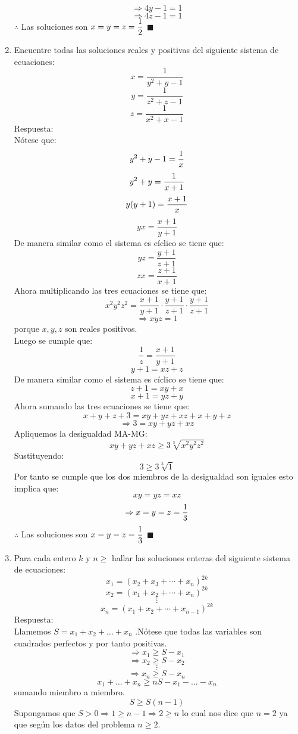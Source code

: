 \documentclass{book}
\begin{document}
\begin{enumerate}
          $$\Rightarrow 4y-1=1$$
          $$\Rightarrow 4z-1=1$$
          $\therefore$ Las soluciones son $\displaystyle{x=y=z={1\over 2}}$ $\blacksquare$\\
    \item Encuentre todas las soluciones reales y positivas del siguiente sistema de ecuaciones:
          $$x=\frac{1}{y^2+y-1}$$
          $$y=\frac{1}{z^2+z-1}$$
          $$z=\frac{1}{x^2+x-1}$$
          Respuesta:\\
          Nótese que:
          $$y^2+y-1={1\over x}$$
          $$y^2+y={1\over x+1}$$
          $$y(y+1)={x+1\over x}$$
          $$yx=\frac{x+1}{y+1}$$
          De manera similar como el sistema es cíclico se tiene que:
          $$yz=\frac{y+1}{z+1}$$
          $$zx=\frac{z+1}{x+1}$$
          Ahora multiplicando las tres ecuaciones se tiene que:
          $$x^2 y^2 z^2=\frac{x+1}{y+1}\cdot\frac{y+1}{z+1}\cdot\frac{y+1}{z+1}$$
          $$\Rightarrow xyz=1$$
          porque $x,y,z$ son reales positivos.\\
          Luego se cumple que:
          $$\frac{1}{z}=\frac{x+1}{y+1}$$
          $$y+1=xz+z$$
          De manera similar como el sistema es cíclico se tiene que:
          $$z+1=xy+x$$
          $$x+1=yz+y$$
          Ahora sumando las tres ecuaciones se tiene que:
          $$x+y+z+3=xy+yz+xz+x+y+z$$
          $$\Rightarrow 3=xy+yz+xz$$
          Apliquemos la desigualdad MA-MG:
          $$xy+yz+xz\geq 3\sqrt[3]{x^2 y^2 z^2}$$
          Sustituyendo:
          $$3\geq 3\sqrt[3]{1}$$
          Por tanto se cumple que los dos miembros de la desigualdad son iguales esto implica que:
          $$xy=yz=xz$$
          $$\Rightarrow x=y=z={1\over 3}$$
          $\therefore$ Las soluciones son $\displaystyle{x=y=z={1\over 3}}$ $\blacksquare$\\
    \item Para cada entero $k$ y $n\geq$  hallar las soluciones enteras del siguiente sistema de ecuaciones:
          $$x_1={(x_2+x_3+\cdots+x_n)}^{2k}$$
          $$x_2={(x_1+x_2+\cdots+x_n)}^{2k}$$
          $$\vdots$$
          $$x_n={(x_1+x_2+\cdots+x_{n-1})}^{2k}$$
          Respuesta:\\
          Llamemos  $S=x_1+x_2+\ldots+x_n$ .Nótese que todas las variables son cuadrados perfectos y por tanto positivas.
          $$\Rightarrow x_1\geq S-x_1$$
          $$\Rightarrow x_2\geq S-x_2$$
          $$\vdots$$
          $$\Rightarrow x_n\geq S-x_n$$
          $$x_1+\ldots+x_n\geq nS-x_1-\ldots-x_n$$ sumando miembro a miembro.
          $$S\geq S(n-1)$$
          Supongamos que  $S> 0 \Rightarrow  1\geq n-1 \Rightarrow  2\geq n $ lo cual nos dice que $n=2$ ya que según los datos del problema $n\geq 2$.\\

\end{enumerate}
\end{document}
